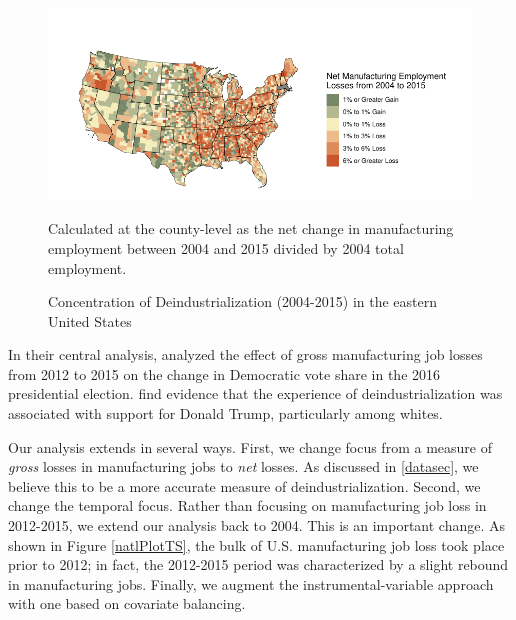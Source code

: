 \documentclass[]{AEA}
\begin{document}
\FloatBarrier
\begin{figure} \label{ManuMap}
\caption{Concentration of Deindustrialization (2004-2015) in the eastern United States }

\begin{center}\includegraphics{Final-Draft_files/figure-latex/unnamed-chunk-2-1} \end{center}



\FloatBarrier
\begin{figurenotes}
Calculated at the county-level as the net change in manufacturing employment between 2004 and 2015 divided by 2004 total employment.
\end{figurenotes}
\end{figure}
\FloatBarrier

In their central analysis, \cite{Baccini21} analyzed the effect of gross
manufacturing job losses from 2012 to 2015 on the change in Democratic
vote share in the 2016 presidential election. \cite{Baccini21} find
evidence that the experience of deindustrialization was associated with
support for Donald Trump, particularly among whites.

Our analysis extends \cite{Baccini21} in several ways. First, we change
focus from a measure of \emph{gross} losses in manufacturing jobs to
\emph{net} losses. As discussed in \ref{datasec}, we believe this to be
a more accurate measure of deindustrialization. Second, we change the
temporal focus. Rather than focusing on manufacturing job loss in
2012-2015, we extend our analysis back to 2004. This is an important
change. As shown in Figure \ref{natlPlotTS}, the bulk of U.S.
manufacturing job loss took place prior to 2012; in fact, the 2012-2015
period was characterized by a slight rebound in manufacturing jobs.
Finally, we augment the instrumental-variable approach with one based on
covariate balancing.
\end{document}
